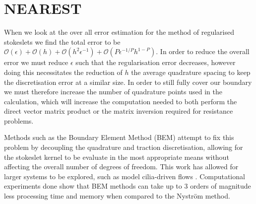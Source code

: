 \section{NEAREST}
When we look at the over all error estimation for the method of regularised stokeslets we find the total error to be $\mathcal{O}(\epsilon) + \mathcal{O}(h) + \mathcal{O}(h^2\epsilon^{-1}) + \mathcal{O}(P\epsilon^{-1/P} h^{1-P})$. In order to reduce the overall error we must reduce $\epsilon$ such that the regularisation error decreases, however doing this necessitates the reduction of $h$ the average quadrature spacing to keep the discretisation error at a similar size. In order to still fully cover our boundary we must therefore increase the number of quadrature points used in the calculation, which will increase the computation needed to both perform the direct vector matrix product or the matrix inversion required for resistance problems. 

Methods such as the Boundary Element Method (BEM) \cite{Smith2009AFlow} attempt to fix this problem by decoupling the quadrature and traction discretisation, allowing for the stokeslet kernel to be evaluate in the most appropriate means without affecting the overall number of degrees of freedom. This work has allowed for larger systems to be explored, such as model cilia-driven flows \cite{Sampaio2014Left-rightLaterality,Smith2012SymmetryEmbryo}. Computational experiments done show that BEM methods can take up to 3 orders of magnitude less processing time and memory \cite{Smith2009AFlow} when compared to the Nyström method.

